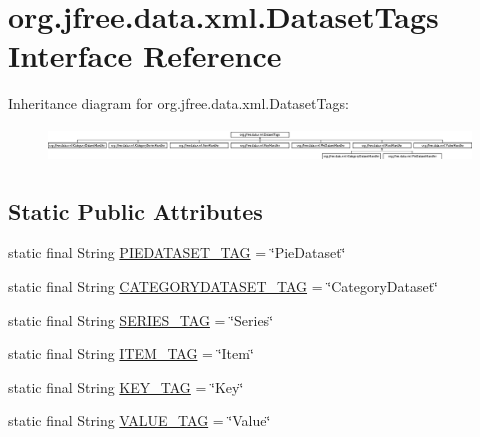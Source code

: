 \hypertarget{interfaceorg_1_1jfree_1_1data_1_1xml_1_1_dataset_tags}{}\section{org.\+jfree.\+data.\+xml.\+Dataset\+Tags Interface Reference}
\label{interfaceorg_1_1jfree_1_1data_1_1xml_1_1_dataset_tags}
Inheritance diagram for org.\+jfree.\+data.\+xml.\+Dataset\+Tags\+:\begin{figure}[H]
\begin{center}
\leavevmode
\includegraphics[height=0.916031cm]{interfaceorg_1_1jfree_1_1data_1_1xml_1_1_dataset_tags}
\end{center}
\end{figure}
\subsection*{Static Public Attributes}
\begin{DoxyCompactItemize}
\item 
static final String \mbox{\hyperlink{interfaceorg_1_1jfree_1_1data_1_1xml_1_1_dataset_tags_ac79168206e229bf0b2e1aa302482175d}{P\+I\+E\+D\+A\+T\+A\+S\+E\+T\+\_\+\+T\+AG}} = \char`\"{}Pie\+Dataset\char`\"{}
\item 
static final String \mbox{\hyperlink{interfaceorg_1_1jfree_1_1data_1_1xml_1_1_dataset_tags_a2ba75be94476bda43f41c38f99b30c1c}{C\+A\+T\+E\+G\+O\+R\+Y\+D\+A\+T\+A\+S\+E\+T\+\_\+\+T\+AG}} = \char`\"{}Category\+Dataset\char`\"{}
\item 
static final String \mbox{\hyperlink{interfaceorg_1_1jfree_1_1data_1_1xml_1_1_dataset_tags_acbd9f2a7764d82901e63a88e9921da5c}{S\+E\+R\+I\+E\+S\+\_\+\+T\+AG}} = \char`\"{}Series\char`\"{}
\item 
static final String \mbox{\hyperlink{interfaceorg_1_1jfree_1_1data_1_1xml_1_1_dataset_tags_a382e57ef3a178873e69ed5d7d0b06597}{I\+T\+E\+M\+\_\+\+T\+AG}} = \char`\"{}Item\char`\"{}
\item 
static final String \mbox{\hyperlink{interfaceorg_1_1jfree_1_1data_1_1xml_1_1_dataset_tags_afbd9baedc9303063f893989c12eb7f6b}{K\+E\+Y\+\_\+\+T\+AG}} = \char`\"{}Key\char`\"{}
\item 
static final String \mbox{\hyperlink{interfaceorg_1_1jfree_1_1data_1_1xml_1_1_dataset_tags_aa6f62e3aa7c7d0655329bd3a0afe578e}{V\+A\+L\+U\+E\+\_\+\+T\+AG}} = \char`\"{}Value\char`\"{}
\end{DoxyCompactItemize}


